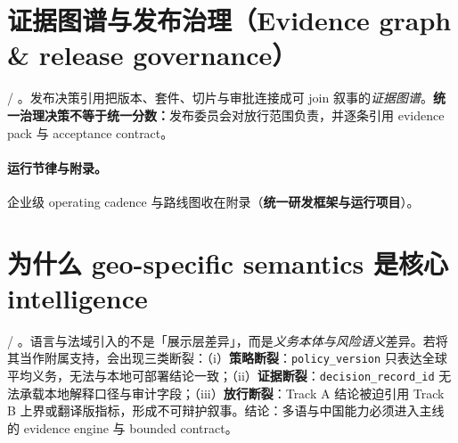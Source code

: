 \documentclass[11pt,a4paper]{report}
\begin{document}
\section{证据图谱与发布治理（Evidence graph \& release governance）}
\EvalFramework{} / \ControlPlane{}。发布决策引用把版本、套件、切片与审批连接成可 join 叙事的\emph{证据图谱}。\textbf{统一治理决策不等于统一分数：}发布委员会对放行范围负责，并逐条引用 evidence pack 与 acceptance contract。

\paragraph{运行节律与附录。}企业级 operating cadence 与路线图收在附录（\textbf{统一研发框架与运行项目}）。




\section{为什么 geo-specific semantics 是核心 intelligence}
\ControlPlane{} / \EvalFramework{}。语言与法域引入的不是「展示层差异」，而是\emph{义务本体与风险语义}差异。若将其当作附属支持，会出现三类断裂：（i）\textbf{策略断裂}：\texttt{policy\_version} 只表达全球平均义务，无法与本地可部署结论一致；（ii）\textbf{证据断裂}：\texttt{decision\_record\_id} 无法承载本地解释口径与审计字段；（iii）\textbf{放行断裂}：Track A 结论被迫引用 Track B 上界或翻译版指标，形成不可辩护叙事。结论：多语与中国能力必须进入主线的 evidence engine 与 bounded contract。
\end{document}
